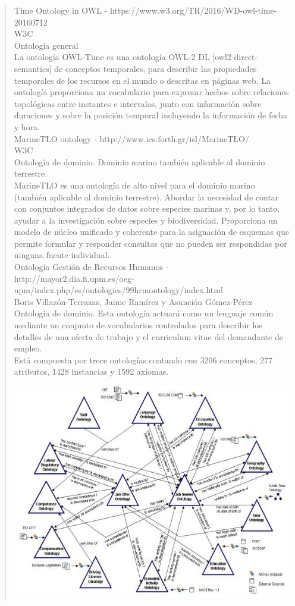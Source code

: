 \documentclass[a4paper,12pt,oneside,final,spanish]{article}
\begin{document}
\begin{quote}
Time Ontology in OWL - https://www.w3.org/TR/2016/WD-owl-time-20160712\\
W3C\\
Ontología general\\
La ontología OWL-Time es una ontología OWL-2 DL [owl2-direct-semantics] de conceptos temporales, para describir las propiedades temporales de los recursos en el mundo o descritas en páginas web. La ontología proporciona un vocabulario para expresar hechos sobre relaciones topológicas entre instantes e intervalos, junto con información sobre duraciones y sobre la posición temporal incluyendo la información de fecha y hora.\\

MarineTLO ontology - http://www.ics.forth.gr/isl/MarineTLO/\\
W3C\\
Ontología de dominio. Dominio marino también aplicable al dominio terrestre.\\
MarineTLO es una ontología de alto nivel para el dominio marino (también aplicable al dominio terrestre). Abordar la necesidad de contar con conjuntos integrados de datos sobre especies marinas y, por lo tanto, ayudar a la investigación sobre especies y biodiversidad.
Proporciona un modelo de núcleo unificado y coherente para la asignación de esquemas que permite formular y responder consultas que no pueden ser respondidas por ninguna fuente individual.\\

Ontología Gestión de Recursos Humanos - http://mayor2.dia.fi.upm.es/oeg-upm/index.php/es/ontologies/99hrmontology/index.html\\
Boris Villazón-Terrazas, Jaime Ramírez y Asunción Gómez-Pérez\\
Ontología de dominio. Esta ontología actuará como un lenguaje común mediante un conjunto de vocabularios controlados para describir los detalles de una oferta de trabajo y el curriculum vitae del demandante de empleo.\\
Está compuesta por trece ontologías contando con 3206 conceptos, 277 atributos, 1428 instancias y 1592 axiomas.

\begin{center}
\includegraphics[width=0.9\linewidth,keepaspectratio]{ont1.jpg}
\end{center}


\end{quote}
\end{document}
